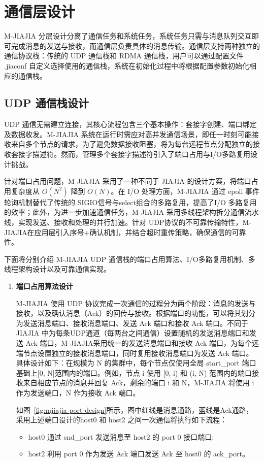 {\section{通信层设计}
M-JIAJIA 分层设计分离了通信任务和系统任务，系统任务只需与消息队列交互即可完成消息的发送与接收，而通信层负责具体的消息传输。通信层支持两种独立的通信协议栈：传统的 UDP 通信栈和 RDMA 通信栈，用户可以通过配置文件 .jiaconf 自定义选择使用的通信栈，系统在初始化过程中将根据配置参数初始化相应的通信栈。

\subsection{UDP 通信栈设计}
UDP 通信无需建立连接，其核心流程包含三个基本操作：套接字创建、端口绑定及数据收发。M-JIAJIA 系统在运行时需应对高并发通信场景，即任一时刻可能接收来自多个节点的请求，为了避免数据接收阻塞，将为每台远程节点分配独立的接收套接字描述符。然而，管理多个套接字描述符引入了端口占用与I/O多路复用设计挑战。

针对端口占用问题，M-JIAJIA 采用了一种不同于 JIAJIA  的设计方案，将端口占用复杂度从 $O(N^2)$ 降到 $O(N)$。在 I/O 处理方面，M-JIAJIA 通过 epoll 事件轮询机制替代了传统的 SIGIO信号与select组合的多路复用，提高了I/O 多路复用的效率；此外，为进一步加速通信任务，M-JIAJIA 采用多线程架构拆分通信流水线，实现发送、接收和处理的并行加速。针对 UDP协议的不可靠传输特性，M-JIAJIA在应用层引入序号+确认机制，并结合超时重传策略，确保通信的可靠性。

下面将分别介绍 M-JIAJIA UDP 通信栈的端口占用算法、I/O多路复用机制、多线程架构设计以及可靠通信实现。
\begin{enumerate}[label=\arabic*.]
    \item \textbf{端口占用算法设计}
    
    M-JIAJIA 使用 UDP 协议完成一次通信的过程分为两个阶段：消息的发送与接收，以及确认消息（Ack）的回传与接收。根据端口的功能，可以将其划分为发送消息端口、接收消息端口、发送 Ack 端口和接收 Ack 端口。不同于 JIAJIA 中为每条UDP通道（每两台之间通信）设置随机的发送消息端口和发送 Ack 端口，M-JIAJIA采用统一的发送消息端口和接收 Ack 端口，为每个远端节点设置独立的接收消息端口，同时复用接收消息端口为发送 Ack 端口。具体设计如下：在规模为 N 的集群中，每个节点仅使用全局 start\_port 端口基础上[0, N]范围内的端口。例如，节点 i 使用 [0, i) 和 (i, N) 范围内的端口接收来自相应节点的消息并回复 Ack，剩余的端口 i 和 N，M-JIAJIA 将使用 i 作为发送端口，N 作为接收 Ack 端口。

    如图~\ref{fig:mjiajia-port-design}所示，图中红线是消息通路，蓝线是Ack通路，采用上述端口设计的host0 和 host2 之间一次通信将执行如下流程：
        \begin{itemize}
            \item host0 通过 snd\_port 发送消息至 host2 的 port 0 接口端口;
            \item host2 利用 port 0 作为发送 Ack 端口发送 Ack 至 host0 的 ack\_port。
        \end{itemize}


\end{enumerate}}

